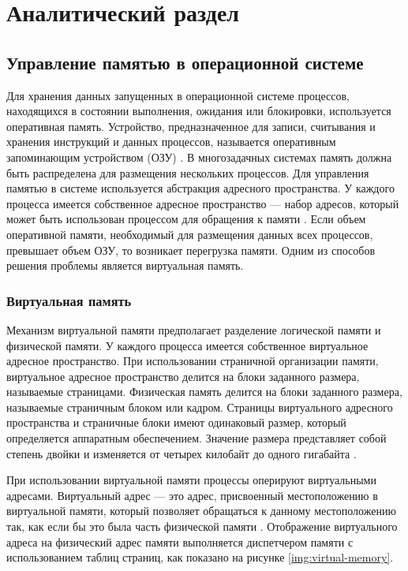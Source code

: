 \chapter{Аналитический раздел}\label{analysis}

\section{Управление памятью в операционной системе}

Для хранения данных запущенных в операционной системе процессов, находящихся в состоянии выполнения, ожидания или блокировки, используется оперативная память. Устройство, предназначенное для записи, считывания и хранения инструкций и данных процессов, называется оперативным запоминающим устройством (ОЗУ) \cite{ram}. В многозадачных системах память должна быть распределена для размещения нескольких процессов. Для управления памятью в системе используется абстракция адресного пространства. У каждого процесса имеется собственное адресное пространство --- набор адресов, который может быть использован процессом для обращения к памяти \cite{address-space}. Если объем оперативной памяти, необходимый для размещения данных всех процессов, превышает объем ОЗУ, то возникает перегрузка памяти. Одним из способов решения проблемы является виртуальная память.

\subsection{Виртуальная память}

Механизм виртуальной памяти предполагает разделение логической памяти и физической памяти. У каждого процесса имеется собственное виртуальное адресное пространство. При использовании страничной организации памяти, виртуальное адресное пространство делится на блоки заданного размера, называемые страницами. Физическая память делится на блоки заданного размера, называемые страничным блоком или кадром. Страницы виртуального адресного пространства и страничные блоки имеют одинаковый размер, который определяется аппаратным обеспечением. Значение размера представляет собой степень двойки и изменяется от четырех килобайт до одного гигабайта \cite{swapping}.

При использовании виртуальной памяти процессы оперируют виртуальными адресами. Виртуальный адрес --- это адрес, присвоенный местоположению в виртуальной памяти, который позволяет обращаться к данному местоположению так, как если бы это была часть физической памяти \cite{address-space}. Отображение виртуального адреса на физический адрес памяти выполняется диспетчером памяти с использованием таблиц страниц, как показано на рисунке \ref{img:virtual-memory}.

